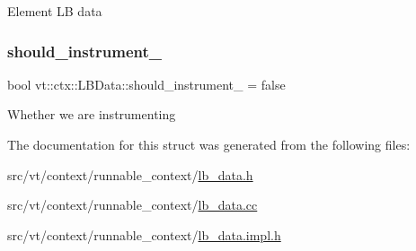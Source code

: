 Element LB data \mbox{\label{structvt_1_1ctx_1_1_l_b_data_a0f36387b1ed5d20e39b72e97251e0efc}} 
\subsubsection{\texorpdfstring{should\+\_\+instrument\+\_\+}{should\_instrument\_}}
{\footnotesize\ttfamily bool vt\+::ctx\+::\+L\+B\+Data\+::should\+\_\+instrument\+\_\+ = false\hspace{0.3cm}{\ttfamily [private]}}

Whether we are instrumenting 

The documentation for this struct was generated from the following files\+:\begin{DoxyCompactItemize}
\item 
src/vt/context/runnable\+\_\+context/\hyperlink{lb__data_8h}{lb\+\_\+data.\+h}\item 
src/vt/context/runnable\+\_\+context/\hyperlink{lb__data_8cc}{lb\+\_\+data.\+cc}\item 
src/vt/context/runnable\+\_\+context/\hyperlink{lb__data_8impl_8h}{lb\+\_\+data.\+impl.\+h}\end{DoxyCompactItemize}

